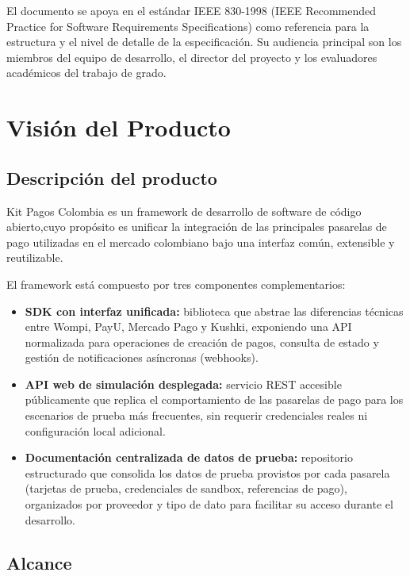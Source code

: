 \documentclass[10pt]{article}
\begin{document}
El documento se apoya en el estándar IEEE 830-1998 (IEEE Recommended Practice for Software Requirements Specifications) como referencia para la estructura y el nivel de detalle de la especificación. Su audiencia principal son los miembros del equipo de desarrollo, el director del proyecto y los evaluadores académicos del trabajo de grado.



\section{Visión del Producto}

\subsection{Descripción del producto}

Kit Pagos Colombia es un framework de desarrollo de software de código abierto,cuyo propósito es unificar la integración de las principales pasarelas de pago utilizadas en el mercado colombiano bajo una interfaz común, extensible y reutilizable.

El framework está compuesto por tres componentes complementarios:

\begin{itemize}
  \item \textbf{SDK con interfaz unificada:} biblioteca que abstrae las diferencias técnicas entre Wompi, PayU, Mercado Pago y Kushki, exponiendo una API normalizada para operaciones de creación de pagos, consulta de estado y gestión de notificaciones asíncronas (webhooks).
  \item \textbf{API web de simulación desplegada:} servicio REST accesible públicamente que replica el comportamiento de las pasarelas de pago para los escenarios de prueba más frecuentes, sin requerir credenciales reales ni configuración local adicional.
  \item \textbf{Documentación centralizada de datos de prueba:} repositorio estructurado que consolida los datos de prueba provistos por cada pasarela (tarjetas de prueba, credenciales de sandbox, referencias de pago), organizados por proveedor y tipo de dato para facilitar su acceso durante el desarrollo.
\end{itemize}

\subsection{Alcance}
\end{document}
